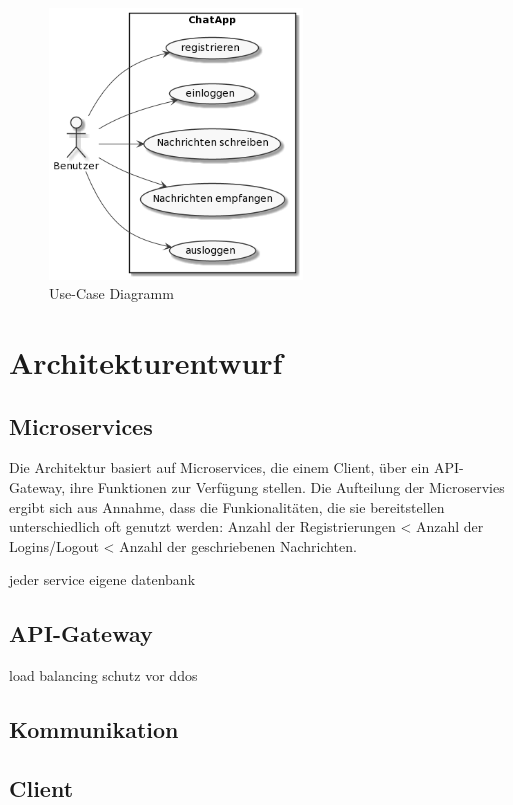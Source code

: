 \begin{figure}[bth] 
	\centering
	\includegraphics[width=0.6\textwidth]{Graphics/Usecase-Diagramm.png}
	\caption{Use-Case Diagramm}
\end{figure}

\section{Architekturentwurf}
\subsection{Microservices}
Die Architektur basiert auf Microservices, die einem Client, über ein API-Gateway, ihre Funktionen zur Verfügung stellen. Die Aufteilung der Microservies ergibt sich aus Annahme, dass die Funkionalitäten, die sie bereitstellen unterschiedlich oft genutzt werden: Anzahl der Registrierungen < Anzahl der Logins/Logout < Anzahl der geschriebenen Nachrichten.

jeder service eigene datenbank

\subsection{API-Gateway}
load balancing
schutz vor ddos

\subsection{Kommunikation}

\subsection{Client}

